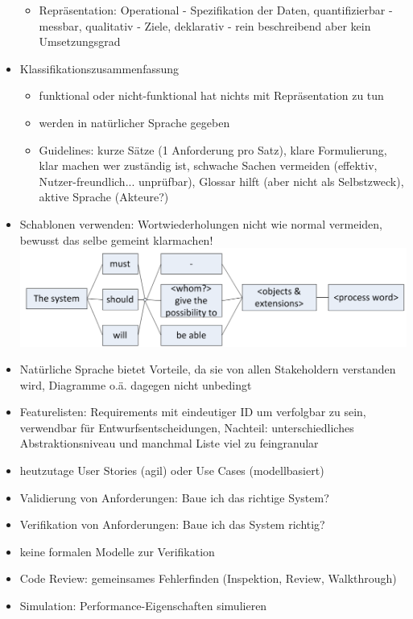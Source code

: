 \documentclass[paper=a4, fontsize=11pt]{scrartcl} %
\numberwithin{equation}{section} %
\numberwithin{figure}{section} %
\numberwithin{table}{section} %
\begin{document}
\begin{itemize}
\begin{itemize}
    \item Repräsentation: Operational - Spezifikation der Daten, quantifizierbar - messbar, qualitativ - Ziele, deklarativ - rein beschreibend aber kein Umsetzungsgrad
  \end{itemize}
  \item Klassifikationszusammenfassung
  \begin{itemize}
    \item funktional oder nicht-funktional hat nichts mit Repräsentation zu tun
    \item werden in natürlicher Sprache gegeben
    \item Guidelines: kurze Sätze (1 Anforderung pro Satz), klare Formulierung, klar machen wer zuständig ist, schwache Sachen vermeiden (effektiv, Nutzer-freundlich... unprüfbar), Glossar hilft (aber nicht als Selbstzweck), aktive Sprache (Akteure?)
  \end{itemize}
  \item Schablonen verwenden: Wortwiederholungen nicht wie normal vermeiden, bewusst das selbe gemeint klarmachen!\\
  \includegraphics[width=\linewidth]{imgs/use_case_template}
  \item Natürliche Sprache bietet Vorteile, da sie von allen Stakeholdern verstanden wird, Diagramme o.ä. dagegen nicht unbedingt
  \item Featurelisten: Requirements mit eindeutiger ID um verfolgbar zu sein, verwendbar für Entwurfsentscheidungen, Nachteil: unterschiedliches Abstraktionsniveau und manchmal Liste viel zu feingranular
  \item heutzutage User Stories (agil) oder Use Cases (modellbasiert)
  \item Validierung von Anforderungen: Baue ich das richtige System?
  \item Verifikation von Anforderungen: Baue ich das System richtig?
  \item keine formalen Modelle zur Verifikation
  \item Code Review: gemeinsames Fehlerfinden (Inspektion, Review, Walkthrough)
  \item Simulation: Performance-Eigenschaften simulieren

\end{itemize}
\end{document}
